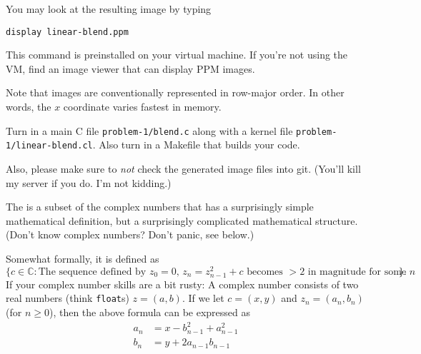 \documentclass[11pt]{article}
\begin{document}
You may look at the resulting image by typing
\begin{lstlisting}
display linear-blend.ppm
\end{lstlisting}

This command is preinstalled on your virtual machine. If you're not
using the VM, find an image viewer that can display PPM images.

Note that images are conventionally represented in row-major
order. In other words, the $x$ coordinate varies fastest in
memory.

Turn in a main C file \texttt{problem-1/blend.c} along with
a kernel file \texttt{problem-1/linear-blend.cl}. Also turn in
a Makefile that builds your code.

Also, please make sure to \emph{not} check the generated image files
into git. (You'll kill my server if you do. I'm not kidding.)

\bigskip
{}

The  is a subset of the complex numbers that has a surprisingly simple
mathematical definition, but a surprisingly complicated mathematical
structure. (Don't know complex numbers?  Don't panic, see below.)

Somewhat formally, it is defined as
\[
  \{c \in \mathbb C: \text{The sequence defined by $z_0=0$,
  $z_n=z_{n-1}^2 +c$ becomes $> 2$ in magnitude for some $n$}\}.
\]
If your complex number skills are a bit rusty: A complex number
consists of two real numbers (think \texttt{float}s) $z=(a,b)$.
If we let $c=(x,y)$ and $z_n=(a_n,b_n)$ (for $n\ge 0$), then the
above formula can be expressed as
\begin{align*}
  a_n &= x-b_{n-1}^2+a_{n-1}^2\\
  b_n &= y+2a_{n-1}b_{n-1}
\end{align*}
\end{document}
